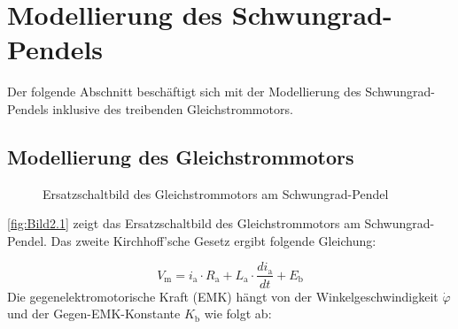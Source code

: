 \pagestyle{aaron}
\section{Modellierung des Schwungrad-Pendels}\label{sec:Modellierung}

Der folgende Abschnitt beschäftigt sich mit der Modellierung des Schwungrad-Pendels inklusive des treibenden Gleichstrommotors.

\subsection{Modellierung des Gleichstrommotors}

\begin{figure}[H]
    \centering
    \caption[Ersatzschaltbild Gleichstrommotor]{Ersatzschaltbild des Gleichstrommotors am Schwungrad-Pendel}
    \label{fig:Bild2.1}
\end{figure}

\autoref{fig:Bild2.1} zeigt das Ersatzschaltbild des Gleichstrommotors am Schwungrad-Pendel. Das zweite Kirchhoff'sche Gesetz ergibt folgende Gleichung:

\begin{equation} \label{eq:Gleichung2.1}
    V_{\mathrm{m}} = i_{\mathrm{a}} \cdot R_{\mathrm{a}} + L_{\mathrm{a}} \cdot \frac{di_{\mathrm{a}}}{dt} + E_{\mathrm{b}}
\end{equation}
\newline
Die gegenelektromotorische Kraft (EMK) hängt von der Winkelgeschwindigkeit $\dot\varphi$ und der Gegen-EMK-Konstante $K_{\mathrm{b}}$ wie folgt ab:

